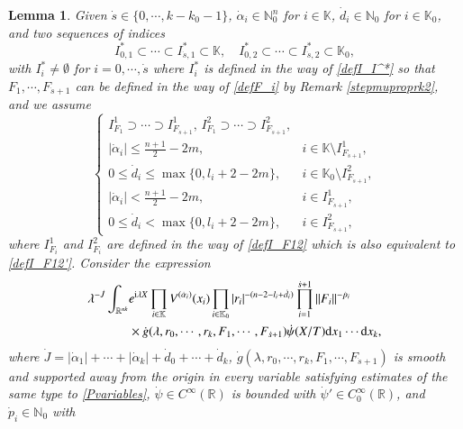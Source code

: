 \documentclass[11pt,reqno]{amsart}
\def\d{{\rm d}}
\newtheorem{lemma}[theorem]{Lemma}
\numberwithin{equation}{section}
\theoremstyle{definition}
\begin{document}
\begin{lemma}\label{lmintonce}
	Given $\dot{s}\in\{0,\cdots,k-k_0-1\}$, $\dot{\alpha}_i\in\mathbb{N}_0^n$ for $i\in\mathbb{K}$, $\dot{d}_i\in\mathbb{N}_0$ for $i\in\mathbb{K}_0$, and two sequences of indices
	\begin{equation}\label{intonceseq}
		I_{0,1}^*\subset\cdots\subset I_{\dot{s},1}^*\subset\mathbb{K},\quad I_{0,2}^*\subset\cdots\subset I_{\dot{s},2}^*\subset\mathbb{K}_0,
	\end{equation}
	with $I_i^*\neq\emptyset$ for $i=0,\cdots,\dot{s}$ where $I_i^*$ is defined in the way of \eqref{defI_I^*} so that $F_1,\cdots,F_{\dot{s}+1}$ can be defined in the way of \eqref{defF_i} by Remark \ref{stepmuproprk2}, and we assume
	\begin{equation}\label{seqalpha}
		\begin{cases}
			I_{F_1}^1\supset\cdots\supset I_{F_{\dot{s}+1}}^1,\,I_{F_1}^2\supset\cdots\supset I_{F_{\dot{s}+1}}^2,\\			
			|\dot{\alpha}_i|\leq\mbox{$\frac{n+1}{2}$}-2m,&i\in\mathbb{K}\setminus I_{F_{\dot{s}+1}}^1,\\			
			0\leq\dot{d}_i\leq\max\{0,l_i+2-2m\},&i\in\mathbb{K}_0\setminus I_{F_{\dot{s}+1}}^2,\\
			|\dot{\alpha}_i|<\mbox{$\frac{n+1}{2}-2m$},&i\in I_{F_{\dot{s}+1}}^1,\\
			0\leq\dot{d}_i<\max\{0,l_i+2-2m\},&i\in I_{F_{\dot{s}+1}}^2,
		\end{cases}
	\end{equation}
	where $I_{F_i}^1$ and $I_{F_i}^2$ are defined in the way of \eqref{defI_F12} which is also equivalent to \eqref{defI_F12'}. Consider the expression
	\begin{equation}\label{dotJ}
		\begin{split}
			\lambda^{-\dot{J}}\int_{\mathbb{R}^{nk}}&e^{\mathrm{i}\lambda X}\prod_{i\in\mathbb{K}}V^{(\dot{\alpha}_i)}(x_i)\prod_{i\in\mathbb{K}_0}|r_i|^{-(n-2-l_i+\dot{d}_i)}\prod_{i=1}^{\dot{s}+1}\|F_i\|^{-{\dot{p}_i}}\\
			&\times\dot{g}(\lambda,r_0,\cdots,r_k,F_1,\cdots,F_{\dot{s}+1})\dot{\psi}(X/T)\d x_1\cdots \d x_k,
		\end{split}
	\end{equation}
	where $\dot{J}=|\dot{\alpha}_1|+\cdots+|\dot{\alpha}_k|+\dot{d}_0+\cdots+\dot{d}_k$, $\dot{g}(\lambda,r_0,\cdots,r_k,F_1,\cdots,F_{\dot{s}+1})$ is smooth and supported away from the origin in every variable satisfying estimates of the same type to \eqref{Pvariables}, $\dot{\psi}\in C^\infty(\mathbb{R})$ is bounded with $\dot{\psi}'\in C_0^\infty(\mathbb{R})$, and $\dot{p}_i\in\mathbb{N}_0$ with

\end{lemma}
\end{document}

